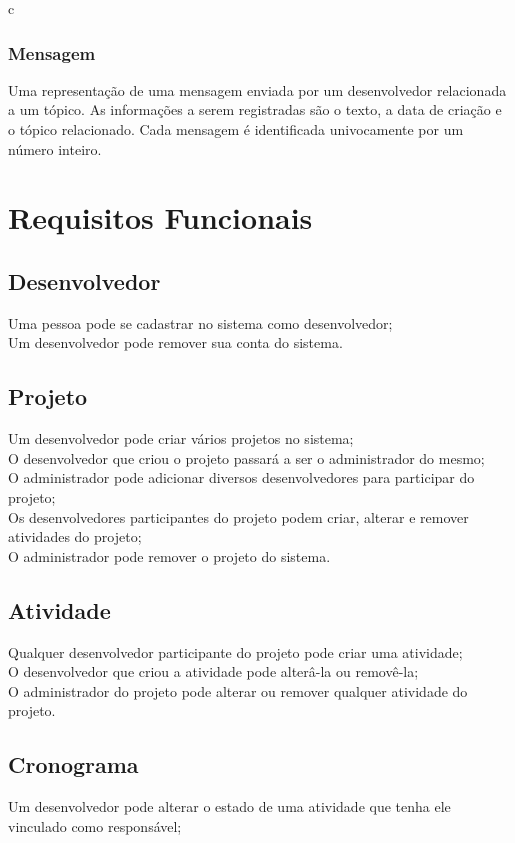 c\documentclass{article}
\begin{document}
		\subsubsection{Mensagem}
		Uma representação de uma mensagem enviada por um desenvolvedor relacionada a um tópico. As informações a serem registradas são o texto, a data de criação e o tópico relacionado. Cada mensagem é identificada univocamente por um número inteiro.



\section{Requisitos Funcionais}

	\subsection{Desenvolvedor}
	Uma pessoa pode se cadastrar no sistema como desenvolvedor;\\
	Um desenvolvedor pode remover sua conta do sistema.

	\subsection{Projeto}
	Um desenvolvedor pode criar vários projetos no sistema;\\
	O desenvolvedor que criou o projeto passará a ser o administrador do mesmo;\\
	O administrador pode adicionar diversos desenvolvedores para participar do projeto;\\
	Os desenvolvedores participantes do projeto podem criar, alterar e remover atividades do projeto;\\
	O administrador pode remover o projeto do sistema.

	\subsection{Atividade}
	Qualquer desenvolvedor participante do projeto pode criar uma atividade;\\
	O desenvolvedor que criou a atividade pode alterâ-la ou removê-la;\\
	O administrador do projeto pode alterar ou remover qualquer atividade do projeto.

	\subsection{Cronograma}
	Um desenvolvedor pode alterar o estado de uma atividade que tenha ele vinculado como responsável;\\
\end{document}
